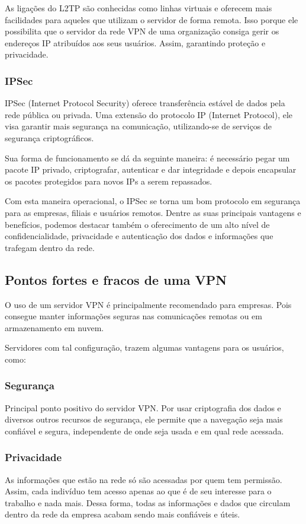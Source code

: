 \documentclass[12pt]{article}
\begin{document}
\begin{flushleft}
As ligações do L2TP são conhecidas como linhas virtuais e oferecem mais facilidades para aqueles que utilizam o servidor de forma remota. Isso porque ele possibilita que o servidor da rede VPN de uma organização consiga gerir os endereços IP atribuídos aos seus usuários. Assim, garantindo proteção e privacidade.

\subsubsection{IPSec}
IPSec (Internet Protocol Security) oferece transferência estável de dados pela rede pública ou privada. Uma extensão do protocolo IP (Internet Protocol), ele visa garantir mais segurança na comunicação, utilizando-se de serviços de segurança criptográficos. 

Sua forma de funcionamento se dá da seguinte maneira: é necessário pegar um pacote IP privado, criptografar, autenticar e dar integridade e depois encapsular os pacotes protegidos para novos IPs a serem repassados.

Com esta maneira operacional, o IPSec se torna um bom protocolo em segurança para as empresas, filiais e usuários remotos. Dentre as suas principais vantagens e benefícios, podemos destacar também o oferecimento de um alto nível de confidencialidade, privacidade e autenticação dos dados e informações que trafegam dentro da rede.


\subsection{Pontos fortes e fracos de uma VPN}

O uso de um servidor VPN é principalmente recomendado para empresas. Pois consegue manter informações seguras nas comunicações remotas ou em armazenamento em nuvem.

Servidores com tal configuração, trazem algumas vantagens para os usuários, como:

\subsubsection{Segurança}

Principal ponto positivo do servidor VPN.  Por usar criptografia dos dados e diversos outros recursos de segurança, ele permite que a navegação seja mais confiável e segura, independente de onde seja usada e em qual rede acessada.

\subsubsection{Privacidade}
As informações que estão na rede só são acessadas por quem tem permissão. Assim, cada indivíduo tem acesso apenas ao que é de seu interesse para o trabalho e nada mais. Dessa forma, todas as informações e dados que circulam dentro da rede da empresa acabam sendo mais confiáveis e úteis. 


\end{flushleft}
\end{document}
